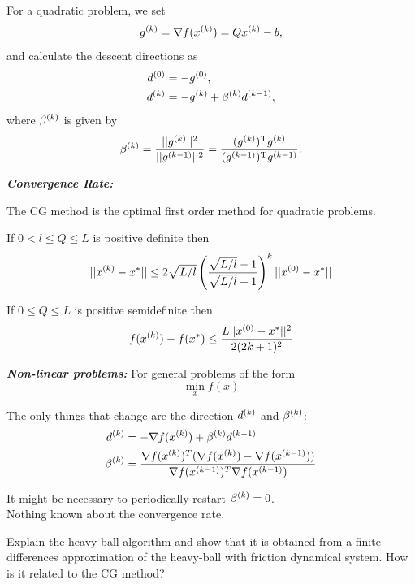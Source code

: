 \documentclass[12pt,a4paper]{article}
\begin{document}
For a quadratic problem, we set
\begin{equation*}
  \kth{g} = \nabla f(\kth{x}) = Q \kth{x} - b,
\end{equation*}
and calculate the descent directions as
\begin{align*}
  \kth[0]{d} &= -\kth[0]{g}, \\
  \kth[k]{d} &= -\kth{g} + \kth{\beta}\kth[k-1]{d},
\end{align*}
where \(\kth{\beta}\) is given by
\begin{equation*}
  \kth{\beta} = \frac{||\kth{g}||^2}{||\kth[k-1]{g}||^2} = \frac{\T{(\kth{g})}\kth{g}}{\T{(\kth[k-1]{g})}\kth[k-1]{g}}.
\end{equation*}

\textit{\textbf{Convergence Rate:}}

The CG method is the optimal first order method for quadratic problems.

If $0 < l \leq Q \leq L$ is positive definite then
\begin{equation*}
    ||\kth{x} - x^*|| \leq 2 \sqrt{L/l} \left( \frac{\sqrt{L/l} - 1}{\sqrt{L/l} + 1} \right)^k ||\kth[0]{x} - x^* ||
\end{equation*}

If $0 \leq Q \leq L$ is positive semidefinite then
\begin{equation*}
    f(\kth{x}) - f(x^*) \leq \frac{L||\kth[0]{x} - x^*||^2}{2(2k + 1)^2}
\end{equation*}


\textit{\textbf{Non-linear problems:}}
For general problems of the form
\begin{equation*}
    \min_x f(x)
\end{equation*}

The only things that change are the direction $\kth{d}$ and $\kth{\beta}$:
\begin{align*}
    \kth{d} &= -\nabla f(\kth{x}) + \kth{\beta}\kth[k-1]{d}\\
    \kth{\beta} &= \frac{\nabla f(\kth{x})^T (\nabla f(\kth{x}) - \nabla f(\kth[k-1]{x}))}{\nabla f(\kth[k-1]{x})^T \nabla f(\kth[k-1]{x}) }
\end{align*}

It might be necessary to periodically restart $\kth{\beta}=0$.\\
Nothing known about the convergence rate.


\begin{question}
Explain the heavy-ball algorithm and show that it is obtained from a finite differences approximation of the heavy-ball with friction dynamical system. How is it related to the CG method?
\end{question}
\end{document}
